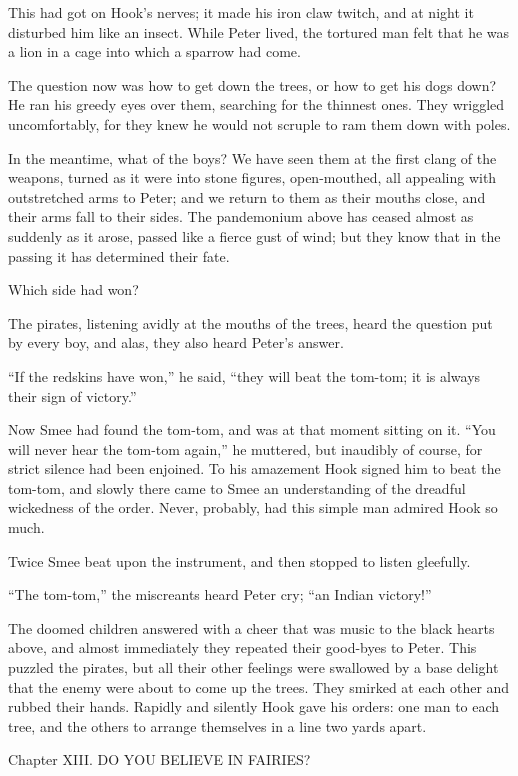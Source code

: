 This had got on Hook's nerves; it made his iron claw twitch, and at
night it disturbed him like an insect. While Peter lived, the tortured
man felt that he was a lion in a cage into which a sparrow had come.

The question now was how to get down the trees, or how to get his dogs
down? He ran his greedy eyes over them, searching for the thinnest
ones. They wriggled uncomfortably, for they knew he would not scruple
to ram them down with poles.

In the meantime, what of the boys? We have seen them at the first clang
of the weapons, turned as it were into stone figures, open-mouthed, all
appealing with outstretched arms to Peter; and we return to them as
their mouths close, and their arms fall to their sides. The pandemonium
above has ceased almost as suddenly as it arose, passed like a fierce
gust of wind; but they know that in the passing it has determined their
fate.

Which side had won?

The pirates, listening avidly at the mouths of the trees, heard the
question put by every boy, and alas, they also heard Peter's answer.

``If the redskins have won,'' he said, ``they will beat the tom-tom; it is
always their sign of victory.''

Now Smee had found the tom-tom, and was at that moment sitting on it.
``You will never hear the tom-tom again,'' he muttered, but inaudibly of
course, for strict silence had been enjoined. To his amazement Hook
signed him to beat the tom-tom, and slowly there came to Smee an
understanding of the dreadful wickedness of the order. Never, probably,
had this simple man admired Hook so much.

Twice Smee beat upon the instrument, and then stopped to listen
gleefully.

``The tom-tom,'' the miscreants heard Peter cry; ``an Indian victory!''

The doomed children answered with a cheer that was music to the black
hearts above, and almost immediately they repeated their good-byes to
Peter. This puzzled the pirates, but all their other feelings were
swallowed by a base delight that the enemy were about to come up the
trees. They smirked at each other and rubbed their hands. Rapidly and
silently Hook gave his orders: one man to each tree, and the others to
arrange themselves in a line two yards apart.




Chapter XIII.
DO YOU BELIEVE IN FAIRIES?


